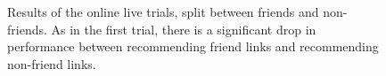 \begin{figure}[t!]
\centering
{}
\caption{Results of the online live trials, split between friends and non-friends. As in the first trial, there is a significant drop in performance between recommending friend links and recommending non-friend links.}
\label{fig:OnlineFriend2}
\end{figure}

